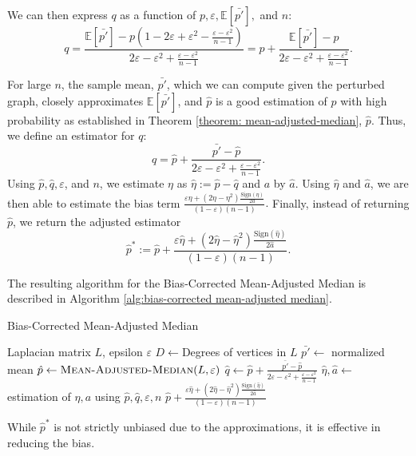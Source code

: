 \documentclass[10pt,onecolumn,letterpaper]{article}
\newcommand{\ee}{\mathbb{E}}
\newcommand{\eps}{\varepsilon}
\let\epsilon\varepsilon
\begin{document}
We can then express $q$ as a function of $p, \eps, \mathbb{E}[\bar{p'}],$ and $n$: $$q = \frac{\mathbb{E}[\bar{p'}] - p\left(1 - 2\eps + \eps^2 - \frac{\eps-\eps^2}{n-1}\right)}{2\eps - \eps^2 + \frac{\eps-\eps^2}{n-1}} = p + \frac{\ee[\bar{p'}] - p}{2\eps - \eps^2 + \frac{\eps-\eps^2}{n-1}}.$$

For large $n$, the sample mean, $\bar{p'}$, which we can compute given the perturbed graph, closely approximates $\mathbb{E}[\bar{p'}]$, and $\hat{p}$ is a good estimation of $p$ with high probability as established in Theorem \ref{theorem: mean-adjusted-median}, $\hat{p}$. Thus, we define an estimator for $q$: $$\hat{q} = \hat p + \frac{\bar{p'} - \hat p}{2\eps - \eps^2 + \frac{\eps-\eps^2}{n-1}}.$$ Using $\hat p, \hat{q},\eps$, and $n$, we estimate $\eta$ as $\hat{\eta} := \hat{p} - \hat{q}$ and $a$ by $\hat{a}$. Using $\hat\eta$ and $\hat a$, we are then able to estimate the bias term $\frac{\eps\eta + (2\eta - \eta^2)\frac{\mathrm{Sign}(\eta)}{2a}}{(1-\eps)(n-1)}.$ Finally, instead of returning $\hat{p}$, we return the adjusted estimator $$\hat{p}^* := \hat{p} + \frac{\eps\hat{\eta} + (2\hat{\eta} - \hat{\eta}^2)\frac{\mathrm{Sign}(\hat{\eta})}{2\hat{a}}}{(1-\eps)(n-1)}.$$

The resulting algorithm for the Bias-Corrected Mean-Adjusted Median is described in Algorithm \ref{alg:bias-corrected mean-adjusted median}.
\begin{algorithm}
\caption{Bias-Corrected Mean-Adjusted Median}\label{alg:bias-corrected mean-adjusted median}
\begin{algorithmic}
\Require Laplacian matrix $L$, epsilon $\epsilon$
\State $D \gets $Degrees of vertices in $L$
\State $\bar{p'} \gets $ normalized mean 
\State $\hat p \gets \Call{Mean-Adjusted-Median}{L, \eps}$
\State $\hat q \gets \hat p + \frac{\bar{p'} - \hat p}{2\eps - \eps^2+\frac{\eps-\eps^2}{n-1}}$
\State $\hat\eta, \hat a \gets$ estimation of $\eta, a$ using $\hat p, \hat q, \eps, n$
\State \Return $\hat p + \frac{\eps\hat\eta + (2\hat\eta - \hat\eta^2)\frac{\mathrm{Sign}(\hat\eta)}{2\hat a}}{(1-\eps)(n-1)}$
\end{algorithmic}
\end{algorithm}

While $\hat{p}^*$ is not strictly unbiased due to the approximations, it is effective in reducing the bias. 
\end{document}
